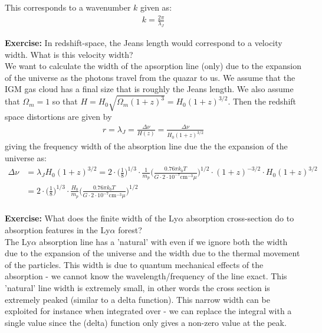 \documentclass[paper=a4, fontsize=11pt]{scrartcl} %
\numberwithin{figure}{section} %
\numberwithin{table}{section} %
\begin{document}
This corresponds to a wavenumber $k$ given as:
\begin{align*}
k = \frac{2\pi}{\lambda_J}
\end{align*}

\textbf{Exercise:} In redshift-space, the Jeans length would correspond to a velocity width. What is this velocity width?\\

We want to calculate the width of the apsorption line (only) due to the expansion of the universe as the photons travel from the quazar to us. We assume that the IGM gas cloud has a final size that is roughly the Jeans length. We also assume that $\Omega_m = 1$ so that $H = H_0 \sqrt{\Omega_m(1+z)^3} = H_0 (1+z)^{3/2}$. Then the redshift space distortions are given by 
\begin{align*}
r = \lambda_J = \frac{\Delta \nu}{H(z)} = \frac{\Delta \nu}{H_0 (1+z)^{3/2}}
\end{align*}
giving the frequency width of the absorption line due the the expansion of the universe as:
\begin{align*}
\Delta \nu &= \lambda_J H_0 (1+z)^{3/2} = 2\cdot \Bigg( \frac{1}{8} \Bigg)^{1/3} \cdot \frac{1}{m_p} \Bigg( \frac{0.76\pi k_bT }{G\cdot 2 \cdot 10^{-7}  \mathrm{cm}^{-3}  \mu} \Bigg)^{1/2} \cdot (1 + z)^{-3/2} \cdot H_0 (1+z)^{3/2}  \\
&= 2\cdot \Bigg( \frac{1}{8} \Bigg)^{1/3} \cdot \frac{H_0}{m_p} \Bigg( \frac{0.76\pi k_bT }{G\cdot 2 \cdot 10^{-7}  \mathrm{cm}^{-3}  \mu} \Bigg)^{1/2} \\
\end{align*} 


\textbf{Exercise:} What does the finite width of the Ly$\alpha$ absorption cross-section do to absorption features in the Ly$\alpha$ forest? \\

The Ly$\alpha$ absorption line has a 'natural' with even if we ignore both the width due to the expansion of the universe and the width due to the thermal movement of the particles. This width is due to quantum mechanical effects of the absorption - we cannot know the wavelength/frequency of the line exact. This 'natural' line width is extremely small, in other words the cross section is extremely peaked (similar to a delta function). This narrow width can be exploited for instance when integrated over - we can replace the integral with a single value since the (delta) function only gives a non-zero value at the peak. \\
\end{document}
